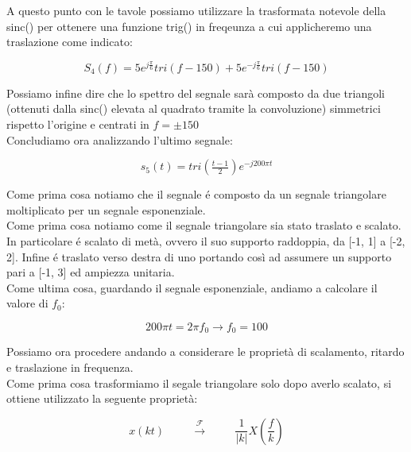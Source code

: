 \documentclass[../main.tex]{subfiles}
\begin{document}
A questo punto con le tavole possiamo utilizzare la trasformata notevole della sinc() per ottenere una funzione trig() in freqeunza a cui applicheremo una traslazione come indicato:

\begin{equation}
	S_4(f) = 5e^{j\frac{\pi}{6}} \unit{tri}(f - 150) + 5e^{-j\frac{\pi}{6}} \unit{tri}(f - 150)
\end{equation}

Possiamo infine dire che lo spettro del segnale sarà composto da due triangoli (ottenuti dalla sinc() elevata al quadrato tramite la convoluzione) simmetrici rispetto l'origine e centrati in $f = \pm 150 $\\


Concludiamo ora analizzando l'ultimo segnale:

\[ s_5(t) = \unit{tri}(\tfrac{t-1}{2}) e^{-j200\pi t} \]

Come prima cosa notiamo che il segnale é composto da un segnale triangolare moltiplicato per un segnale esponenziale.\\


Come prima cosa notiamo come il segnale triangolare sia stato traslato e scalato.\\


In particolare é scalato di metà, ovvero il suo supporto raddoppia, da [-1, 1] a [-2, 2]. Infine é traslato verso destra di uno portando così ad assumere un supporto pari a [-1, 3] ed ampiezza unitaria.\\

Come ultima cosa, guardando il segnale esponenziale, andiamo a calcolare il valore di $f_0$:

\begin{equation}
	200 \pi t = 2 \pi f_0 \rightarrow f_0 = 100
\end{equation}

Possiamo ora procedere andando a considerare le proprietà di scalamento, ritardo e traslazione in frequenza.\\


Come prima cosa trasformiamo il segale triangolare solo dopo averlo scalato, si ottiene utilizzato la seguente proprietà:

\begin{equation}
	x(kt) \hspace{1cm} \xrightarrow{\mathcal{F}}  \hspace{1cm} \frac{1}{|k|} X(\frac{f}{k})
\end{equation} 
\end{document}
